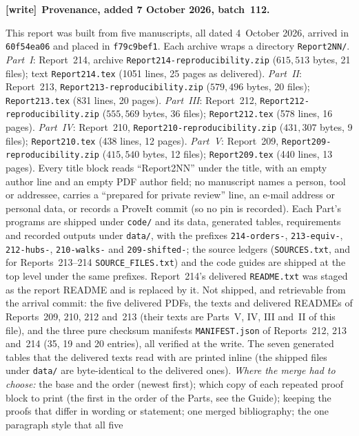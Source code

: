 \documentclass[11pt,letterpaper]{article}
\theoremstyle{remark}\newtheorem{remark}[theorem]{Remark}
\newcommand{\file}[1]{\nolinkurl{#1}}
\newenvironment{writenote}[1][]{\par\smallskip\begingroup\small
 \noindent\textbf{[write]}\if\relax\detokenize{#1}\relax\else~\textbf{#1.}\fi\ }%
 {\par\endgroup\smallskip}
\theoremstyle{definition}\newtheorem{definition}[theorem]{Definition}
\begin{document}
\begin{writenote}[Provenance, added 7 October 2026, batch~112]\raggedright
This report was built from five manuscripts, all dated 4~October 2026,
arrived in \file{60f54ea06} and placed in \file{f79c9bef1}. Each archive
wraps a directory \file{Report2NN/}. \emph{Part~I}: Report~214, archive
\file{Report214-reproducibility.zip} ($615{,}513$ bytes, 21 files); text
\file{Report214.tex} (1051 lines, 25 pages as delivered). \emph{Part~II}:
Report~213, \file{Report213-reproducibility.zip} ($579{,}496$ bytes, 20
files); \file{Report213.tex} (831 lines, 20 pages). \emph{Part~III}:
Report~212, \file{Report212-reproducibility.zip} ($555{,}569$ bytes, 36
files); \file{Report212.tex} (578 lines, 16 pages). \emph{Part~IV}:
Report~210, \file{Report210-reproducibility.zip} ($431{,}307$ bytes, 9
files); \file{Report210.tex} (438 lines, 12 pages). \emph{Part~V}:
Report~209, \file{Report209-reproducibility.zip} ($415{,}540$ bytes, 12
files); \file{Report209.tex} (440 lines, 13 pages). Every title block reads
``Report2NN'' under the title, with an empty author line and an empty PDF
author field; no manuscript names a person, tool or addressee, carries a
``prepared for private review'' line, an e-mail address or personal data, or
records a ProveIt commit (so no pin is recorded). Each Part's programs are
shipped under \file{code/} and its data, generated tables, requirements and
recorded outputs under \file{data/}, with the prefixes \file{214-orders-},
\file{213-equiv-}, \file{212-hubs-}, \file{210-walks-} and
\file{209-shifted-}; the source ledgers (\file{SOURCES.txt}, and for
Reports~213--214 \file{SOURCE_FILES.txt}) and the code guides are shipped at
the top level under the same prefixes. Report~214's delivered
\file{README.txt} was staged as the report README and is replaced by it. Not
shipped, and retrievable from the arrival commit: the five delivered PDFs,
the texts and delivered READMEs of Reports~209, 210, 212 and~213 (their texts
are Parts~V, IV, III and~II of this file), and the three pure checksum
manifests \file{MANIFEST.json} of Reports~212, 213 and~214 (35, 19 and 20
entries), all verified at the write. The seven generated tables that the
delivered texts read with \verb|| are printed inline (the shipped
files under \file{data/} are byte-identical to the delivered ones).
\emph{Where the merge had to choose:} the base and the order (newest first);
which copy of each repeated proof block to print (the first in the order of
the Parts, see the Guide); keeping the proofs that differ in wording or
statement; one merged bibliography; the one paragraph style that all five

\end{writenote}
\end{document}
